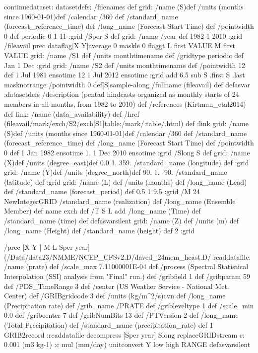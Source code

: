 \begin{ingrid}
continuedataset:
datasetdefs:
/filenames {
} def
grid:
/name (S)def
/units (months since 1960-01-01)def
/calendar /360 def
/standard_name (forecast_reference_time) def
/long_name (Forecast Start Time) def
/pointwidth 0 def
periodic
0 1 11
:grid
/Sper S def
grid:
/name /year def
1982 1 2010
:grid
/fileavail {
prec dataflag[X Y]average 0 maskle 0 flaggt L first VALUE M first VALUE grid: /name /S1 def /units monthtimename def /gridtype periodic def Jan 1 Dec :grid grid: /name /S2 def /units monthtimename def /pointwidth 12 def 1 Jul 1981 ensotime 12 1 Jul 2012 ensotime :grid add 6.5 sub S .first S .last masknotrange /pointwidth 0 def[S]sample-along /fullname (fileavail) def
} defasvar
:datasetdefs
/description (pentad hindcasts organized as monthly starts of 24 members in all months, from 1982 to 2010) def
/references (Kirtman_etal2014) def
link:
/name (data_availability) def
/href (fileavail/mark/exch/S2/exch[S1]table:/mark/:table/.html) def 
:link
grid:
/name (S)def
/units (months since 1960-01-01)def
/calendar /360 def
/standard_name (forecast_reference_time) def
/long_name (Forecast Start Time) def
/pointwidth 0 def
1 Jan 1982 ensotime
 1. 
1 Dec 2010 ensotime
:grid
/Slong S def
grid:
/name (X)def
/units (degree_east)def
 0.0 1. 359.
/standard_name (longitude) def
:grid
grid:
/name (Y)def
/units (degree_north)def
 90. 1. -90.
/standard_name (latitude) def
:grid
grid:
/name (L) def
/units (months) def
/long_name (Lead) def
/standard_name (forecast_period) def
0.5 1 9.5
:grid
/M 24 NewIntegerGRID
/standard_name (realization) def
/long_name (Ensemble Member) def
 name exch def
/T { S L add
/long_name (Time) def
/standard_name (time) def } defasvarsilent
grid:
/name (Z) def
/units (m) def
/long_name (Height) def
/standard_name (height) def
2 :grid
\end{ingrid}
\begin{ingrid}
 /prec{
[X
    Y  |
    M L Sper year] (/Data/data23/NMME/NCEP_CFSv2.D/daved_24mem_hcast.D/%
readdatafile:
/name (prate) def
 /scale_max 7.11000001E-04 def
 /process (Spectral Statistical Interpolation (SSI) analysis from "Final" run.) def
 /gribfield 1 def
 /gribparam 59 def
 /PDS_TimeRange 3 def
 /center (US Weather Service - National Met. Center) def
 /GRIBgridcode 3 def
 /units (kg/m^2/s)cvn def
 /long_name (Precipitation rate) def
 /grib_name /PRATE def
 /gribleveltype 1 def
 /scale_min 0.0 def
 /gribcenter 7 def
 /gribNumBits 13 def
 /PTVersion 2 def
/long_name (Total Precipitation) def
/standard_name (precipitation_rate) def
1 GRIB2record :readdatafile
decompress
[Sper year] Slong replaceGRIDstream
c: 0.001 (m3 kg-1) :c
mul (mm/day) unitconvert
Y low high RANGE
}defasvarsilent
\end{ingrid}
